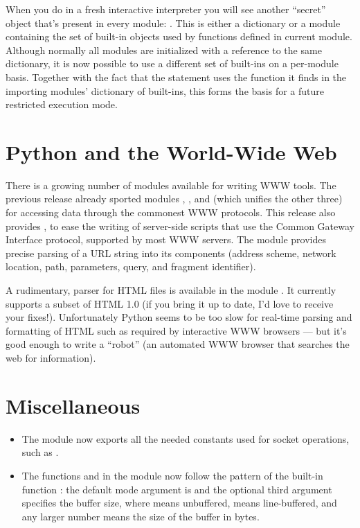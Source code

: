 When you do  in a fresh interactive interpreter you will
see another ``secret'' object that's present in every module:
.  This is either a dictionary or a module
containing the set of built-in objects used by functions defined in
current module.  Although normally all modules are initialized with a
reference to the same dictionary, it is now possible to use a
different set of built-ins on a per-module basis.  Together with the
fact that the  statement uses the 
function it finds in the importing modules' dictionary of built-ins,
this forms the basis for a future restricted execution mode.


\section{Python and the World-Wide Web}

There is a growing number of modules available for writing WWW tools.
The previous release already sported modules ,
,  and  (which unifies the
other three) for accessing data through the commonest WWW protocols.
This release also provides , to ease the writing of
server-side scripts that use the Common Gateway Interface protocol,
supported by most WWW servers.  The module  provides
precise parsing of a URL string into its components (address scheme,
network location, path, parameters, query, and fragment identifier).

A rudimentary, parser for HTML files is available in the module
.  It currently supports a subset of HTML 1.0 (if you
bring it up to date, I'd love to receive your fixes!).  Unfortunately
Python seems to be too slow for real-time parsing and formatting of
HTML such as required by interactive WWW browsers --- but it's good
enough to write a ``robot'' (an automated WWW browser that searches
the web for information).


\section{Miscellaneous}

\begin{itemize}

\item
The  module now exports all the needed constants used for
socket operations, such as .

\item
The functions  and  in the 
module now follow the pattern of the built-in function :
the default mode argument is  and the optional third
argument specifies the buffer size, where  means unbuffered,
 means line-buffered, and any larger number means the size of
the buffer in bytes.

\end{itemize}



